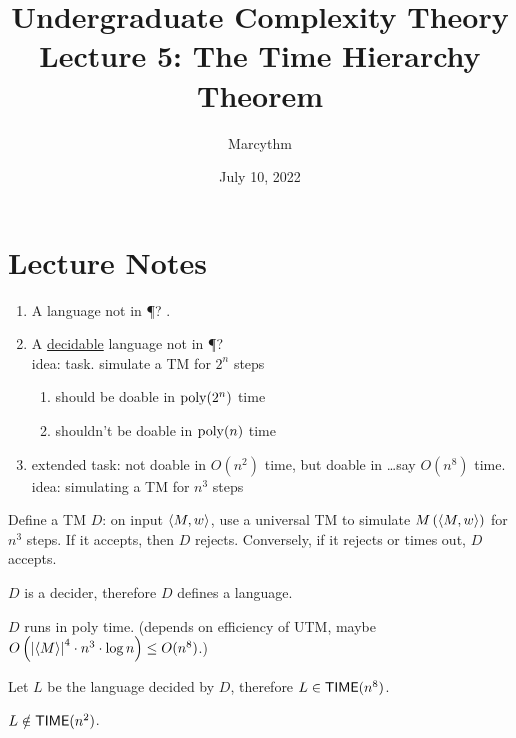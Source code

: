 \documentclass{article}
\title{Undergraduate Complexity Theory \\ Lecture 5: The Time Hierarchy Theorem}
\author{Marcythm}
\date{July 10, 2022}
\begin{document}
\maketitle{}

\section{Lecture Notes}

\begin{enumerate}
  \item A language not in \P? .

  \item A \ul{decidable} language not in \P? \\
        idea: task. simulate a TM for \(2^n\) steps
  \begin{enumerate}
    \item should be doable in \(\operatorname{poly}(2^n)\) time
    \item shouldn't be doable in \(\operatorname{poly}(n)\) time
  \end{enumerate}

  \item extended task: not doable in \(O(n^2)\) time, but doable in \ldots say \(O(n^8)\) time. \\
        idea: simulating a TM for \(n^3\) steps
\end{enumerate}

\begin{definition}
  Define a TM \(D\): on input \(\left\langle M, w \right\rangle\), use a universal TM to simulate \(M\left\lparen \left\langle M, w \right\rangle \right\rparen\) for \(n^3\) steps. If it accepts, then \(D\) rejects. Conversely, if it rejects or times out, \(D\) accepts.
\end{definition}

\begin{fact}
  \(D\) is a decider, therefore \(D\) defines a language.
\end{fact}

\begin{fact}
  \(D\) runs in poly time. (depends on efficiency of UTM, maybe \(O\left\lparen \left\lvert \left\langle M \right\rangle \right\rvert^4 \cdot n^3 \cdot \log{n} \right\rparen \leq O(n^8)\).)
\end{fact}

\begin{fact}
  Let \(L\) be the language decided by \(D\), therefore \(L \in \text{\sf TIME}(n^8)\).
\end{fact}

\begin{claim}
  \(L \notin \text{\sf TIME}(n^2)\).
\end{claim}
\end{document}
